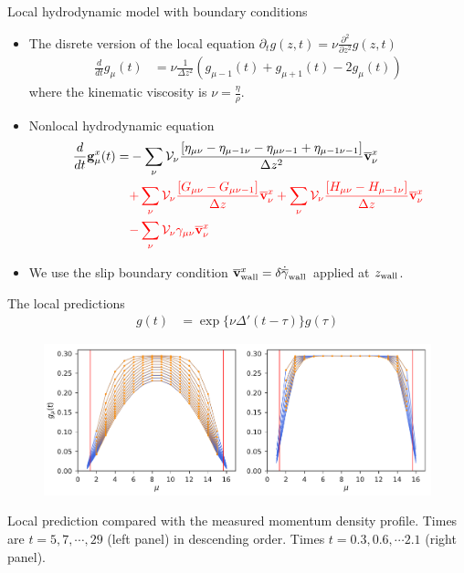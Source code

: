 \documentclass{beamer}
\begin{document}
\begin{frame}{Local hydrodynamic model with boundary conditions}  
  \begin{itemize}
    \item The disrete version of the local equation $\partial_t g(z,t)=\nu\frac{\partial^2}{\partial z^2} g(z,t)$
\begin{align}
  \frac{d}{dt}g_\mu(t)&=\nu \frac{1}{\Delta z^2}(g_{\mu-1}(t)+g_{\mu+1}(t)-2g_{\mu}(t))
\nonumber
\end{align}
where the kinematic viscosity is $\nu=\frac{\eta}{\rho}$.
    \item Nonlocal hydrodynamic equation  
\begin{align}
  \frac{d}{dt}{\bf g}^x_\mu(t)=&
-\sum_{\nu} {\cal V}_\nu \frac{\left[\eta_{\mu\nu}-\eta_{\mu-1\nu}-\eta_{\mu\nu-1}+\eta_{\mu-1\nu-1}\right]}{\Delta z^2}\overline{\bf v}^x_\nu \nonumber \\
  &{\color{red}+\sum_{\nu} {\cal V}_\nu\frac{\left[G_{\mu\nu}-G_{\mu\nu-1}\right]}{\Delta z}\overline{\bf v}^x_\nu
+\sum_{\nu} {\cal V}_\nu\frac{\left[H_{\mu\nu}-H_{\mu-1\nu}\right]}{\Delta z}
  \overline{\bf v}^x_\nu}
\nonumber \\
  &{\color{red}-\sum_{\nu} {\cal V}_\nu\gamma_{\mu\nu}\overline{\bf v}^x_\nu}
\nonumber
\end{align}
\item We use the slip boundary condition $\overline{\bf v}_{\rm wall}^x=\delta \dot{\overline{\gamma}}_{\rm wall}$ applied at $z_{\rm wall}$.
  \end{itemize}
\end{frame}

\begin{frame}{The local predictions}
\begin{align}
 g(t)&=\exp\{\nu \Delta' (t-\tau)\}g(\tau)
\nonumber
\end{align}
\begin{figure}[]
\includegraphics[width=\linewidth]{gxtLocalPrediction-17nodes-WALLS}
\end{figure}
  {\color{orange} Local  prediction}
  compared with the {\color{blue} measured} momentum density
  profile. Times  are $t=5,7,\cdots,29$  (left panel) in descending  order. Times $t=0.3,0.6,\cdots2.1$ (right panel).
\end{frame}
\end{document}
